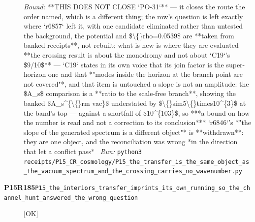 \begin{description}
 \emph{Bound:}  **THIS DOES NOT CLOSE `PO-31`** --- it closes the route the order named, which is a different thing; the row's question is left exactly where `r6857` left it, with one candidate eliminated rather than untested  the background, the potential and \$\textbackslash\{\}rho=0.0539\$ are **taken from banked receipts**, not rebuilt; what is new is where they are evaluated  **the crossing result is about the monodromy and not about `C19`'s \$9/10\$** --- `C19` states in its own voice that its join factor is the super-horizon one and that *"modes inside the horizon at the branch point are not covered"*, and that item is untouched  a slope is not an amplitude: the \$A\_s\$ comparison is a **ratio to the scale-free branch**, showing the banked \$A\_s\textasciicircum{}\{\textbackslash\{\}rm vac\}\$ understated by \$\textbackslash\{\}sim5\textbackslash\{\}times10\textasciicircum{}\{3\}\$ at the band's top --- against a shortfall of \$10\textasciicircum{}\{103\}\$, so ***a bound on how the number is read and not a correction to its conclusion***  `r6846`'s *"the slope of the generated spectrum is a different object"* is **withdrawn**: they are one object, and the reconciliation was wrong *in the direction that let a conflict pass*
\ \emph{Run:} \texttt{python3 receipts/P15\_CR\_cosmology/P15\_the\_transfer\_is\_the\_same\_object\_as\_the\_vacuum\_spectrum\_and\_the\_crossing\_carries\_no\_wavenumber.py}
\item[\rcptlabel{P15_the_interiors_transfer_imprints_its_own_running_so_the_channel_hunt_answered_the_wrong_question}{P15R185}\textbf{P15R185}\quad\texttt{P15\_the\_interiors\_transfer\_imprints\_its\_own\_running\_so\_the\_channel\_hunt\_answered\_the\_wrong\_question}]\hfill\textsf{[OK]}\\

\end{description}
